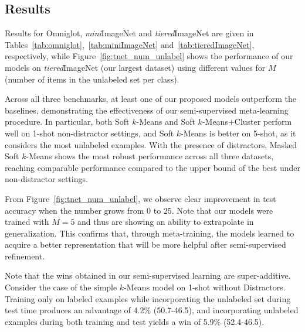 \subsection{Results}






Results for Omniglot, {\it mini}ImageNet and {\it tiered}ImageNet are given in
Tables~\ref{tab:omniglot},~\ref{tab:miniImageNet} and~\ref{tab:tieredImageNet}, respectively, while
Figure~\ref{fig:tnet_num_unlabel} shows the performance of our models on {\it tiered}ImageNet (our
largest dataset) using different values for $M$ (number of items in the unlabeled set per class).

Across all three benchmarks, at least one of our proposed models outperform the baselines,
demonstrating the effectiveness of our semi-supervised meta-learning procedure. 
In particular, 
both
Soft $k$-Means and Soft $k$-Means+Cluster perform well on 1-shot non-distractor settings, and 
Soft $k$-Means is better on 5-shot, as it considers the most unlabeled examples. 
With the presence of distractors, Masked Soft $k$-Means shows the most robust performance across all
three datasets, reaching comparable performance compared to the upper bound of the best under
non-distractor settings.


From Figure~\ref{fig:tnet_num_unlabel}, we observe clear improvement in test accuracy when the
number grows from 0 to 25. Note that our models were trained with $M=5$ and thus are showing an
ability to extrapolate in generalization. This confirms that, through meta-training, the models
learned to acquire a better representation that will be more helpful after semi-supervised
refinement.

Note that the wins obtained in our semi-supervised learning are super-additive. Consider the case of
the simple $k$-Means model on 1-shot without Distractors. Training only on labeled examples while
incorporating the unlabeled set during test time produces an advantage of 4.2\% (50.7-46.5), and
incorporating unlabeled examples during both training and test yields a win of 5.9\% (52.4-46.5).

